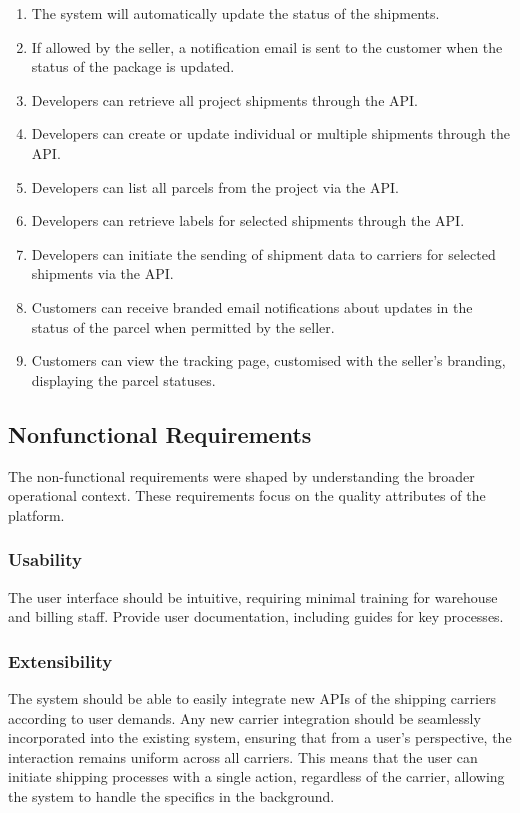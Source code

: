 \begin{enumerate}[label=\bfseries FR\arabic*:,leftmargin=*]
    \item The system will automatically update the status of the shipments.
    \item If allowed by the seller, a notification email is sent to the customer when the status of the package is updated.
    \item Developers can retrieve all project shipments through the API.
    \item Developers can create or update individual or multiple shipments through the API.
    \item Developers can list all parcels from the project via the API.
    \item Developers can retrieve labels for selected shipments through the API.
    \item Developers can initiate the sending of shipment data to carriers for selected shipments via the API.
    \item Customers can receive branded email notifications about updates in the status of the parcel when permitted by the seller.
    \item Customers can view the tracking page, customised with the seller's branding, displaying the parcel statuses.
\end{enumerate}

\subsection{Nonfunctional Requirements}
\label{subsec:nonfunctional-requirements}
The non-functional requirements were shaped by understanding the broader operational context.
These requirements focus on the quality attributes of the platform.

\subsubsection{Usability}
The user interface should be intuitive, requiring minimal training for warehouse and billing staff.
Provide user documentation, including guides for key processes.

\subsubsection{Extensibility}
The system should be able to easily integrate new APIs of the shipping carriers according to user demands.
Any new carrier integration should be seamlessly incorporated into the existing system, ensuring that from a user's perspective, the interaction remains uniform across all carriers.
This means that the user can initiate shipping processes with a single action, regardless of the carrier, allowing the system to handle the specifics in the background.


